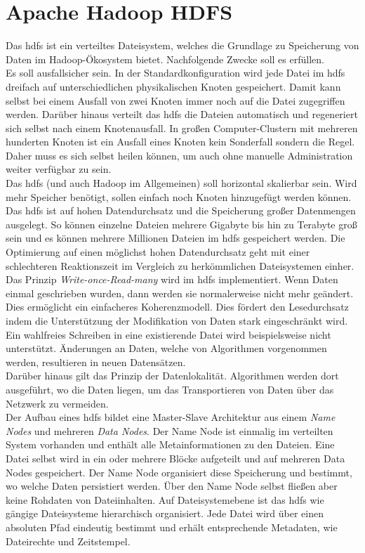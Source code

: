 \section{Apache Hadoop HDFS}
\label{sec:theory_hdfs}
Das \acrfull{hdfs} ist ein verteiltes Dateisystem, welches die Grundlage zu Speicherung von Daten im Hadoop-Ökosystem bietet. Nachfolgende Zwecke soll es erfüllen.\\
Es soll ausfallsicher sein. In der Standardkonfiguration wird jede Datei im \gls{hdfs} dreifach auf unterschiedlichen physikalischen Knoten gespeichert. Damit kann selbst bei einem Ausfall von zwei Knoten immer noch auf die Datei zugegriffen werden. Darüber hinaus verteilt das \gls{hdfs} die Dateien automatisch und regeneriert sich selbst nach einem Knotenausfall. In großen Computer-Clustern mit mehreren hunderten Knoten ist ein Ausfall eines Knoten kein Sonderfall sondern die Regel. Daher muss es sich selbst heilen können, um auch ohne manuelle Administration weiter verfügbar zu sein.\\
Das \gls{hdfs} (und auch Hadoop im Allgemeinen) soll horizontal skalierbar sein. Wird mehr Speicher benötigt, sollen einfach noch Knoten hinzugefügt werden können.\\
Das \gls{hdfs} ist auf hohen Datendurchsatz und die Speicherung großer Datenmengen ausgelegt.
So können einzelne Dateien mehrere Gigabyte bis hin zu Terabyte groß sein und es können mehrere Millionen Dateien im \gls{hdfs} gespeichert werden. Die Optimierung auf einen möglichst hohen Datendurchsatz geht mit einer schlechteren Reaktionszeit im Vergleich zu herkömmlichen Dateisystemen einher.\\
Das Prinzip \textit{Write-once-Read-many} wird im \gls{hdfs} implementiert. Wenn Daten einmal geschrieben wurden, dann werden sie normalerweise nicht mehr geändert. Dies ermöglicht ein einfacheres Koherenzmodell. Dies fördert den Lesedurchsatz indem die Unterstützung der Modifikation von Daten stark eingeschränkt wird. Ein wahlfreies Schreiben in eine existierende Datei wird beispielsweise nicht unterstützt. Änderungen an Daten, welche von Algorithmen vorgenommen werden, resultieren in neuen Datensätzen.\\
Darüber hinaus gilt das Prinzip der Datenlokalität. Algorithmen werden dort ausgeführt, wo die Daten liegen, um das Transportieren von Daten über das Netzwerk zu vermeiden.\cite{hdfs_architecture}\\

\noindent
Der Aufbau eines \gls{hdfs} bildet eine Master-Slave Architektur aus einem \textit{Name Nodes} und mehreren \textit{Data Nodes}. Der Name Node ist einmalig im verteilten System vorhanden und enthält alle Metainformationen zu den Dateien. Eine Datei selbst wird in ein oder mehrere Blöcke aufgeteilt und auf mehreren Data Nodes gespeichert. Der Name Node organisiert diese Speicherung und bestimmt, wo welche Daten persistiert werden. Über den Name Node selbst fließen aber keine Rohdaten von Dateiinhalten. Auf Dateisystemebene ist das \gls{hdfs} wie gängige Dateisysteme hierarchisch organisiert. Jede Datei wird über einen absoluten Pfad eindeutig bestimmt und erhält entsprechende Metadaten, wie Dateirechte und Zeitstempel.  \\


